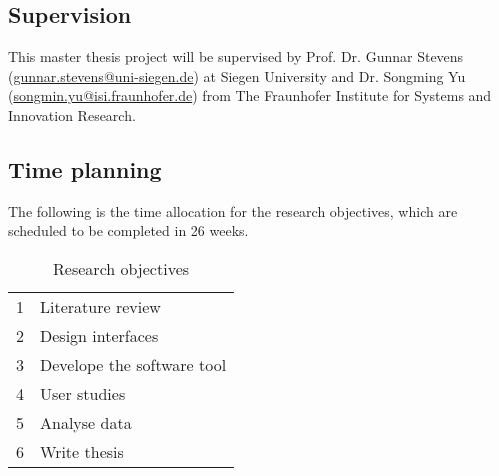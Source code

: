\subsection{Supervision}

This master thesis project will be supervised by 
Prof. Dr. Gunnar Stevens (\href{mailto:gunnar.stevens@uni-siegen.de}{gunnar.stevens@uni-siegen.de}) at Siegen University and 
Dr. Songming Yu (\href{mailto:songmin.yu@isi.fraunhofer.de}{songmin.yu@isi.fraunhofer.de}) from The Fraunhofer Institute for Systems and Innovation Research. 


\subsection{Time planning}


The following is the time allocation for the research objectives, which are scheduled to be completed in 26 weeks. \\

\begin{table}[h]
  \begin{center}
    \begin{tabular}{ p{} p{} }
      \cellcolor[rgb]{0.94,0.96,0.98}1 & Literature review \\
      \cellcolor[rgb]{0.86,0.90,0.96}2 & Design interfaces\\ 
      \cellcolor[rgb]{0.78,0.84,0.94}3 & Develope the software tool\\
      \cellcolor[rgb]{0.71,0.78,0.92}4 & User studies \\
      \cellcolor[rgb]{0.63,0.73,0.89}5 & Analyse data\\
      \cellcolor[rgb]{0.55,0.67,0.87}6 & Write thesis \\
    \end{tabular}
    \caption{Research objectives}
    \label{tab:objectives}
  \end{center}
\end{table}

